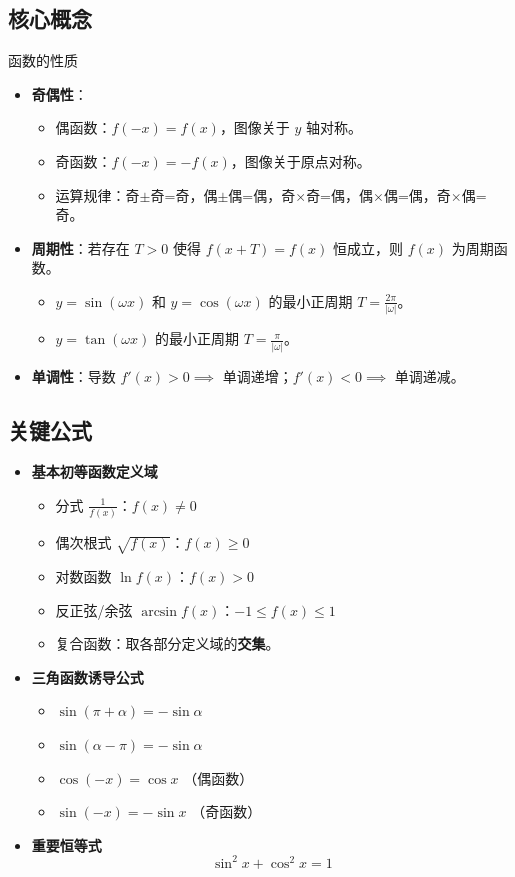 \documentclass[UTF8, a4paper, 10pt]{ctexart} %
\newenvironment{formula}{
    \begin{tcolorbox}[
        colback=white, 
        colframe=blue!50!black, 
        title=关键公式, 
        fonttitle=\bfseries\small, 
        arc=1mm,
        left=2pt, right=2pt, top=2pt, bottom=2pt, %
        toptitle=1pt, bottomtitle=1pt
    ]
    \begin{itemize}[leftmargin=*, nosep, labelsep=3pt] 
}{
    \end{itemize}
    \end{tcolorbox}
}
\begin{document}
\subsection{核心概念}
\begin{concept}{函数的性质}
    \begin{itemize}[nosep] %
        \item \textbf{奇偶性}：
        \begin{itemize}[nosep]
            \item 偶函数：$f(-x) = f(x)$，图像关于 $y$ 轴对称。
            \item 奇函数：$f(-x) = -f(x)$，图像关于原点对称。
            \item 运算规律：奇$\pm$奇=奇，偶$\pm$偶=偶，奇$\times$奇=偶，偶$\times$偶=偶，奇$\times$偶=奇。
        \end{itemize}
        \item \textbf{周期性}：若存在 $T>0$ 使得 $f(x+T) = f(x)$ 恒成立，则 $f(x)$ 为周期函数。
        \begin{itemize}[nosep]
            \item $y=\sin(\omega x)$ 和 $y=\cos(\omega x)$ 的最小正周期 $T = \frac{2\pi}{|\omega|}$。
            \item $y=\tan(\omega x)$ 的最小正周期 $T = \frac{\pi}{|\omega|}$。
        \end{itemize}
        \item \textbf{单调性}：导数 $f'(x)>0 \implies$ 单调递增；$f'(x)<0 \implies$ 单调递减。
    \end{itemize}
\end{concept}

\subsection{关键公式}
\begin{formula}
    \item \textbf{基本初等函数定义域}
    \begin{itemize}[nosep]
        \item 分式 $\frac{1}{f(x)}$：$f(x) \neq 0$
        \item 偶次根式 $\sqrt{f(x)}$：$f(x) \ge 0$
        \item 对数函数 $\ln f(x)$：$f(x) > 0$
        \item 反正弦/余弦 $\arcsin f(x)$：$-1 \le f(x) \le 1$
        \item 复合函数：取各部分定义域的\textbf{交集}。
    \end{itemize}
    \item \textbf{三角函数诱导公式}
    \begin{itemize}[nosep]
        \item $\sin(\pi + \alpha) = -\sin \alpha$
        \item $\sin(\alpha - \pi) = -\sin \alpha$
        \item $\cos(-x) = \cos x$ （偶函数）
        \item $\sin(-x) = -\sin x$ （奇函数）
    \end{itemize}
    \item \textbf{重要恒等式}
    $$ \sin^2 x + \cos^2 x = 1 $$
\end{formula}
\end{document}
